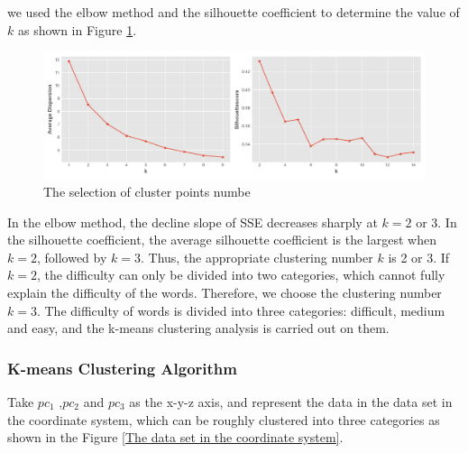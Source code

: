 \documentclass[
  journal=medium,
  manuscript=Report,
  year=2023,
  volume=37,
]{cup-journal}
\begin{document}
we used the elbow method and the silhouette coefficient to determine the value of $k$ as shown in Figure \ref{cluster points}.

\begin{figure}[hbt!]
    \centering
    \includegraphics[width=\linewidth]{pic/聚类评价系数.png}
    \caption{The selection of cluster points numbe}
    \label{cluster points}
\end{figure}

In the elbow method, the decline slope of SSE decreases sharply at $k = 2 $ or 3. In the silhouette coefficient, the average silhouette coefficient is the largest when $k = 2$, followed by $k = 3$. Thus, the appropriate clustering number $k$ is 2 or 3. If $k = 2$, the difficulty can only be divided into two categories, which cannot fully explain the difficulty of the words. Therefore, we choose the clustering number $k = 3$. The difficulty of words is divided into three categories: difficult, medium and easy, and the k-means clustering analysis is carried out on them.

\subsubsection{K-means Clustering Algorithm}

Take $pc_1$ ,$pc_2$ and $pc_3$ as the x-y-z axis, and represent the data in the data set in the coordinate system, which can be roughly clustered into three categories as shown in the Figure \ref{The data set in the coordinate system}.
\end{document}
